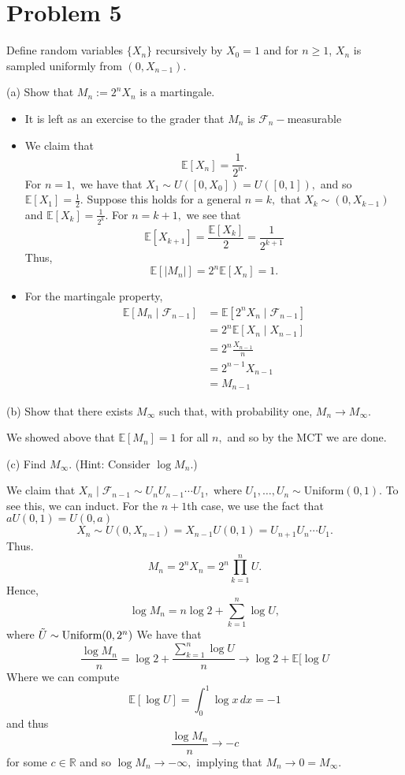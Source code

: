 \documentclass[11pt]{article}
\newcommand{\bbE}{\mathbb{E}}
\newcommand{\bbR}{\mathbb{R}}
\begin{document}
\newpage

\section*{Problem 5}
Define random variables \(\{X_n\}\) recursively by \(X_0 = 1\) and for \(n \geq 1\), \(X_n\) is sampled uniformly from \((0, X_{n-1})\).

(a) Show that \(M_n := 2^n X_n\) is a martingale.
\begin{solution}
    \begin{itemize}
        \item  It is left as an exercise to the grader that $M_n$ is $\mathcal{F}_n-$measurable
        \item We claim that 
        \[\bbE[X_n] = \frac{1}{2^n}.\] For $n=1,$ we have that $X_1 \sim U([0,X_0]) = U([0,1]),$ and so $\bbE[X_1] = \frac{1}{2}.$ Suppose this holds for a general $n=k,$ that $X_k \sim (0, X_{k-1})$ and $\bbE[X_k] = \frac{1}{2^k}.$ For $n = k+1,$ we see that 
        \[\bbE[X_{k+1}] =\frac{\bbE[X_k]}{2} = \frac{1}{2^{k+1}}\]
        Thus, 
        \[\bbE[|M_n|] = 2^n\bbE[X_n] = 1.\]
        \item For the martingale property, 
        \begin{align*}
            \bbE[M_n \mid \mathcal{F}_{n-1}] &= \bbE[2^n X_n \mid \mathcal{F}_{n-1}]\\
            &= 2^n \bbE[X_{n} \mid {X}_{n-1}]\\
            &= 2^n \frac{X_{n-1}}{n}\\
            &= 2^{n-1}X_{n-1}\\
            &= M_{n-1}
        \end{align*}
    \end{itemize}
\end{solution}

(b) Show that there exists \(M_\infty\) such that, with probability one, \(M_n \to M_\infty\).
\begin{solution}
    We showed above that $\bbE[M_n] = 1$ for all $n,$ and so by the MCT we are done.
\end{solution}

(c) Find \(M_\infty\). (Hint: Consider \(\log M_n\).)
\begin{solution}
We claim that $X_n \mid \mathcal{F}_{n-1} \sim U_n U_{n-1}\cdots U_1,$ where $U_1, \dots, U_n \sim \text{Uniform}(0,1).$ To see this, we can induct. For the $n+1$th case, we use the fact that $aU(0,1) = U(0,a)$
\[X_n \sim U(0, X_{n-1}) = X_{n-1}U(0,1) = U_{n+1} U_{n}\cdots U_1.\]
Thus.
\[M_n = 2^n X_n = 2^n \prod_{k=1}^n U.\] Hence,
\[\log M_n = n \log 2 + \sum_{k=1}^n \log U,\] where $\Tilde{U} \sim \text{Uniform} (0,2^n)$ We have that 
\[\frac{\log M_n}{n} = \log 2 + \frac{\sum_{k=1}^n \log U}{n} \to \log 2 + \bbE[\log U\] Where we can compute 
\[\bbE[\log U] = \int_{0}^1 \log x \,dx = -1\] and thus 
\[\frac{\log M_n}{n} \to -c\] for some $c\in \bbR$ and so $\log M_n \to -\infty,$ implying that $M_n \to 0 = M_\infty.$


\end{solution}
\end{document}
